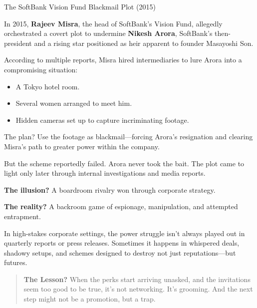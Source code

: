 \begin{HistoricalSidebar}{The SoftBank Vision Fund Blackmail Plot (2015)}
  
  In 2015, \textbf{Rajeev Misra}, the head of SoftBank’s Vision Fund, allegedly orchestrated 
  a covert plot to undermine \textbf{Nikesh Arora}, SoftBank’s then-president and a rising 
  star positioned as heir apparent to founder Masayoshi Son.
  
  \medskip
  
  According to multiple reports, Misra hired intermediaries to lure Arora into a compromising 
  situation:  
  
  \medskip
  
  \begin{itemize}
    \item A Tokyo hotel room.
    \item Several women arranged to meet him.
    \item Hidden cameras set up to capture incriminating footage.
  \end{itemize}

  \medskip
  
  The plan?  Use the footage as blackmail—forcing Arora’s resignation and clearing Misra’s 
  path to greater power within the company.
  
  \medskip
  
  But the scheme reportedly failed. Arora never took the bait. The plot came to light only 
  later through internal investigations and media reports.
  
  \medskip
  
  \textbf{The illusion?} A boardroom rivalry won through corporate strategy.
  
  \medskip
  
  \textbf{The reality?} A backroom game of espionage, manipulation, and attempted entrapment.
  
  \medskip
  
  In high-stakes corporate settings, the power struggle isn’t always played out in quarterly 
  reports or press releases. Sometimes it happens in whispered deals, shadowy setups, and 
  schemes designed to destroy not just reputations—but futures.
  
  \begin{quote}
  \textbf{The Lesson?} When the perks start arriving unasked, and the invitations seem too good 
  to be true, it’s not networking. It’s grooming. And the next step might not be a promotion, 
  but a trap.
  \end{quote}
  
\end{HistoricalSidebar}

